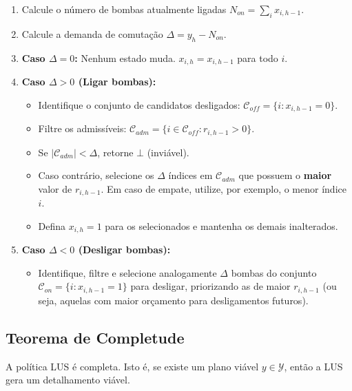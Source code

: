 \documentclass{article}
\theoremstyle{definition}
\begin{document}
\begin{enumerate}
	\item Calcule o número de bombas atualmente ligadas $N_{on} = \sum_i x_{i,h-1}$.
	\item Calcule a demanda de comutação $\Delta = y_h - N_{on}$.
	\item \textbf{Caso $\Delta = 0$:} Nenhum estado muda. $x_{i,h} = x_{i,h-1}$ para todo $i$.

	\item \textbf{Caso $\Delta > 0$ (Ligar bombas):}
	      \begin{itemize}
		      \item Identifique o conjunto de candidatos desligados: $\mathcal{C}_{off} = \{ i : x_{i,h-1} = 0 \}$.
		      \item Filtre os admissíveis: $\mathcal{C}_{adm} = \{ i \in \mathcal{C}_{off} : r_{i,h-1} > 0 \}$.
		      \item Se $|\mathcal{C}_{adm}| < \Delta$, retorne $\bot$ (inviável).
		      \item Caso contrário, selecione os $\Delta$ índices em $\mathcal{C}_{adm}$ que possuem o \textbf{maior} valor de $r_{i,h-1}$. Em caso de empate, utilize, por exemplo, o menor índice $i$.
		      \item Defina $x_{i,h}=1$ para os selecionados e mantenha os demais inalterados.
	      \end{itemize}

	\item \textbf{Caso $\Delta < 0$ (Desligar bombas):}
	      \begin{itemize}
		      \item Identifique, filtre e selecione analogamente $\Delta$ bombas do conjunto $\mathcal{C}_{on} = \{ i : x_{i,h-1} = 1 \}$ para desligar, priorizando as de maior $r_{i,h-1}$ (ou seja, aquelas com maior orçamento para desligamentos futuros).
	      \end{itemize}
\end{enumerate}

\subsection{Teorema de Completude}

\begin{theorem}
	A política LUS é completa. Isto é, se existe um plano viável $y \in \mathcal{Y}$, então a LUS gera um detalhamento viável.
\end{theorem}
\end{document}
